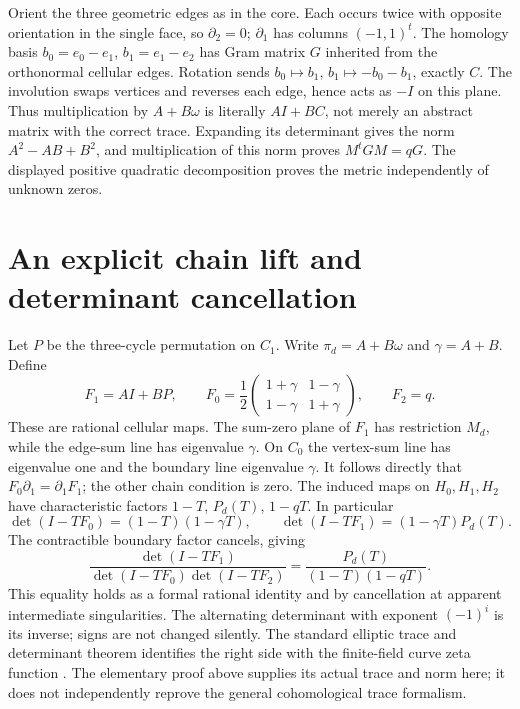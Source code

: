 Orient the three geometric edges as in the core. Each occurs twice with opposite orientation in the single face, so $\partial_2=0$; $\partial_1$ has columns $(-1,1)^t$. The homology basis $b_0=e_0-e_1$, $b_1=e_1-e_2$ has Gram matrix $G$ inherited from the orthonormal cellular edges. Rotation sends $b_0\mapsto b_1$, $b_1\mapsto-b_0-b_1$, exactly $C$. The involution swaps vertices and reverses each edge, hence acts as $-I$ on this plane. Thus multiplication by $A+B\omega$ is literally $AI+BC$, not merely an abstract matrix with the correct trace. Expanding its determinant gives the norm $A^2-AB+B^2$, and multiplication of this norm proves $M^tGM=qG$. The displayed positive quadratic decomposition proves the metric independently of unknown zeros.

\section{An explicit chain lift and determinant cancellation}
Let $P$ be the three-cycle permutation on $C_1$. Write $\pi_d=A+B\omega$ and $\gamma=A+B$. Define
\[
 F_1=AI+BP,\qquad
 F_0=\frac12\begin{pmatrix}1+\gamma&1-\gamma\\1-\gamma&1+\gamma\end{pmatrix},\qquad
 F_2=q.
\]
These are rational cellular maps. The sum-zero plane of $F_1$ has restriction $M_d$, while the edge-sum line has eigenvalue $\gamma$. On $C_0$ the vertex-sum line has eigenvalue one and the boundary line eigenvalue $\gamma$. It follows directly that $F_0\partial_1=\partial_1F_1$; the other chain condition is zero. The induced maps on $H_0,H_1,H_2$ have characteristic factors $1-T$, $P_d(T)$, $1-qT$. In particular
\[
 \det(I-TF_0)=(1-T)(1-\gamma T),\qquad
 \det(I-TF_1)=(1-\gamma T)P_d(T).
\]
The contractible boundary factor cancels, giving
\[
 \frac{\det(I-TF_1)}{\det(I-TF_0)\det(I-TF_2)}
 =\frac{P_d(T)}{(1-T)(1-qT)}.
\]
This equality holds as a formal rational identity and by cancellation at apparent intermediate singularities. The alternating determinant with exponent $(-1)^i$ is its inverse; signs are not changed silently. The standard elliptic trace and determinant theorem identifies the right side with the finite-field curve zeta function \cite{SGAFourHalf,DeligneWeilI}. The elementary proof above supplies its actual trace and norm here; it does not independently reprove the general cohomological trace formalism.

